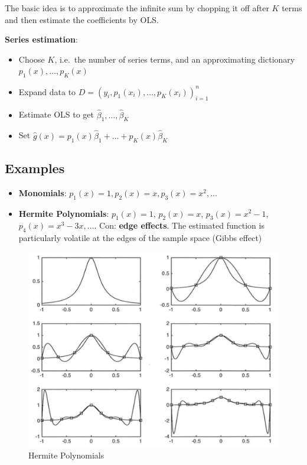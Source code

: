 \documentclass[12pt,]{book}
\providecommand{\tightlist}{%
  \setlength{\itemsep}{0pt}\setlength{\parskip}{0pt}}
\begin{document}
The basic idea is to approximate the infinite sum by chopping it off after \(K\) terms and then estimate the coefficients by OLS.

\textbf{Series estimation}:

\begin{itemize}
\tightlist
\item
  Choose \(K\), i.e.~the number of series terms, and an approximating dictionary \(p_1(x), \dots, p_K(x)\)
\item
  Expand data to \(D = \left( y_i, p_1(x_i), \dots, p_K(x_i) \right)_{i=1}^n\)
\item
  Estimate OLS to get \(\hat{\beta}_1, \dots, \hat{\beta}_K\)
\item
  Set \(\hat{g}(x) = p_1 (x)\hat{\beta}_1 + \dots + p_K(x) \hat{\beta}_K\)
\end{itemize}

\hypertarget{examples}{%
\subsection{Examples}\label{examples}}

\begin{itemize}
\item
  \textbf{Monomials}: \(p_1(x) = 1, p_2(x) = x, p_3(x)=x^2, \dots\)
\item
  \textbf{Hermite Polynomials}: \(p_1(x) = 1\), \(p_2(x) = x\), \(p_3(x)=x^2 -1\), \(p_4(x)= x^3 - 3x, \dots\). Con: \textbf{edge effects}. The estimated function is particularly volatile at the edges of the sample space (Gibbs effect)
\end{itemize}

\begin{figure}
\centering
\includegraphics{figures/Fig_531.png}
\caption{Hermite Polynomials}
\end{figure}
\end{document}
